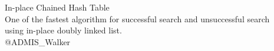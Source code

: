 \begin{titlepage}


\vspace*{120truept}
\begin{center}
  \leavevmode\\\leavevmode\\ %
  \vspace{30truept}
  \huge{In-place Chained Hash Table}\\ %
  \large{One of the fastest algorithm for successful search and unsuccessful search\\using in-place doubly linked list.}\\ %
\vspace{100truept}
\leavevmode \newline %
\leavevmode \newline %
\LARGE{@ADMIS\_Walker}\\ %
\end{center}


\end{titlepage}
